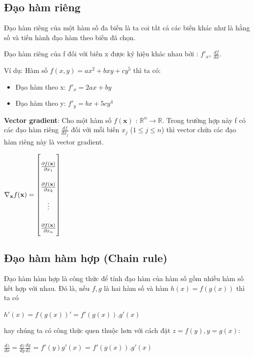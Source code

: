 \subsection{Đạo hàm riêng}
Đạo hàm riêng của một hàm số đa biến là ta coi tất cả các biến khác như là hằng số và tiến hành đạo hàm theo biến đã chọn. \par
Đạo hàm riêng của f đối với biến x được ký hiệu khác nhau bởi : ${  f'_x }$,  ${  \frac{df}{dx} }.$\par
Ví dụ: Hàm số $f(x,y) = ax^2 + bxy + cy^5$ thì ta có:
\begin{itemize}
\setlength{\itemindent}{10mm}
	\item Đạo hàm theo x: ${  f'_x = 2ax +by}$
	\item Đạo hàm theo y: ${  f'_y = bx +5cy^4}$	
\end{itemize}

\textbf{Vector gradient}:
Cho một hàm số $f(\textbf{x})$ : $\mathbb{R}^n \rightarrow \mathbb{R}$. Trong trường hợp này f có các đạo hàm riêng $   \frac{df}{d x_j}$ đối với mỗi biến $ x_j$ ($1\leq j \leq n$) thì vector chứa các đạo hàm riêng này là vector gradient.\par
\begin{center}

$ \nabla_\textbf{x}f(\textbf{x}) =
\renewcommand{\arraystretch}{2.5} 
\begin{bmatrix}

\frac{\partial f(\textbf{x})}{\partial x_1}\\ \frac{\partial f(\textbf{x})}{\partial x_2} \\ \vdots \\ \frac{\partial f(\textbf{x})}{\partial x_n}
\end{bmatrix}  $
\end{center}

\subsection{Đạo hàm hàm hợp (Chain rule)}

 Đạo hàm hàm hợp là công thức để tính đạo hàm của hàm số gồm nhiều hàm số kết hợp với nhau. Đó là, nếu $f, g$ là hai hàm số và hàm $h(x) = f(g(x))$ thì ta có 
\begin{center}
$h'(x) = f(g(x))' = f'(g(x)).g'(x) $

\end{center}
hay chúng ta có công thức quen thuộc hơn với cách đặt $z=f(y), y=g(x)$:
\begin{center}
$\frac{dz}{dx} = \frac{dz}{dy} \frac{dy}{dz}$ = $f'(y)g'(x)$ = $f'(g(x)).g'(x)$
\end{center}

